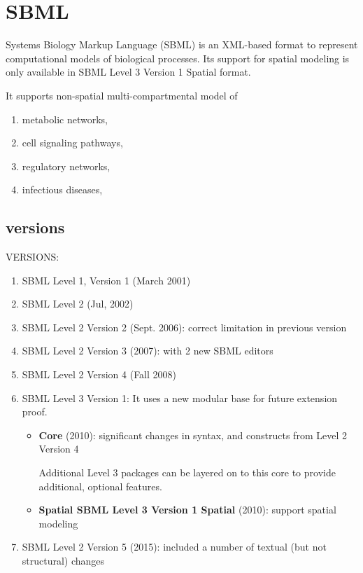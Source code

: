 \section{SBML}
\label{sec:SBML}

 Systems Biology Markup Language (SBML) is an XML-based format to represent 
 computational models of biological processes.
 Its support for spatial modeling is only available in SBML Level 3 Version 1
 Spatial format.
 
 It supports non-spatial multi-compartmental model of
 \begin{enumerate}
   \item  metabolic networks, 
   
   \item cell signaling pathways, 
   
   \item regulatory networks,
   
   \item infectious diseases,
 \end{enumerate}
 
\subsection{versions}

 VERSIONS: 
 \begin{enumerate}
   \item  SBML Level 1, Version 1 (March 2001)
   
   \item SBML Level 2 (Jul, 2002)
   
   \item SBML Level 2 Version 2 (Sept. 2006): correct limitation in previous
   version
   
   \item SBML Level 2 Version 3 (2007): with 2 new SBML editors
   
   \item SBML Level 2 Version 4 (Fall 2008)
   
   \item SBML Level 3 Version 1: It uses  a new modular base for future extension proof.
   
   \begin{itemize}
     \item  {\bf Core} (2010): significant changes in syntax, and
   constructs from Level 2 Version 4
   
Additional Level 3 packages can be layered on to this core to provide
additional, optional features.

     \item {\bf Spatial SBML Level 3 Version 1 Spatial} (2010): support spatial
     modeling
   \end{itemize}
   


     
   \item SBML Level 2 Version 5 (2015): included a number of textual (but not
   structural) changes 
 \end{enumerate}

